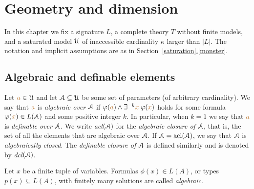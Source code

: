 \chapter{Geometry and dimension}\label{geometria}



\def\medrel#1{\parbox[t]{5ex}{$\displaystyle\hfil #1$}}
\def\ceq#1#2#3{\parbox{35ex}{$\displaystyle #1$}\medrel{#2}$\displaystyle  #3$}

In this chapter we fix a signature $L$, a complete theory $T$ without finite models, and a saturated model $\EuScript U$ of inaccessible cardinality $\kappa$ larger than $|L|$.
The notation and implicit assumptions are as in Section~\hyperref[monster]{\ref*{saturation}.\ref*{monster}}.


\section{Algebraic and definable elements}\label{acl}

Let ${\color{brown} a}\in\EuScript U$ and let $\EuScript A\subseteq\EuScript U$ be some set of parameters (of arbitrary cardinality).
We say that ${\color{brown} a}$ is \emph{algebraic over $\EuScript A$\/} if $\varphi({\color{brown} a})\wedge\exists^{=k}{\color{brown} x}\;\varphi({\color{brown} x})$ holds for some  formula $\varphi({\color{brown} x})\in L(\EuScript A)$ and  some positive integer $k$.
In particular, when $k=1$ we say that ${\color{brown} a}$ is \emph{definable over $\EuScript A$}.
We write \emph{acl$(\EuScript A)$} for the \emph{algebraic closure of $\EuScript A$}, that is, the set of all the elements that are algebraic over $\EuScript A$.
If $\EuScript A=\mathop{\rm acl}(\EuScript A)$, we say that $\EuScript A$ is \emph{algebraically closed}.
The \emph{definable closure of $\EuScript A$\/} is defined similarly and is denoted by \emph{dcl$(\EuScript A)$}. 

Let $x$ be a finite tuple of variables.
Formulas $\phi(x)\in L(A)$, or types $p(x)\subseteq L(A)$, with finitely many solutions are called \emph{algebraic}.

